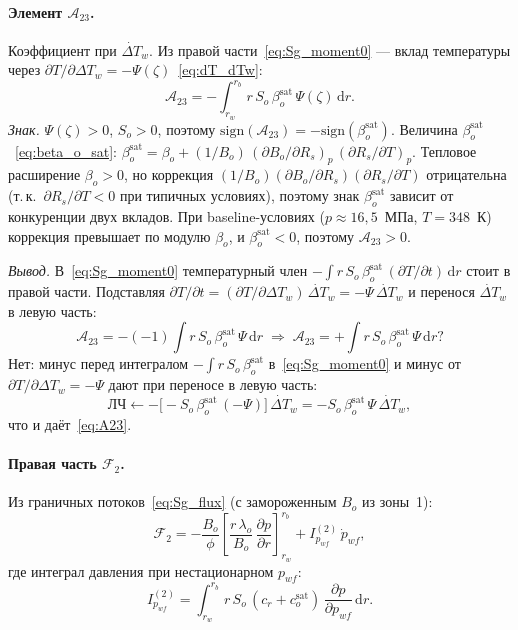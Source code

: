 \documentclass[12pt,a4paper]{article}
\newcommand{\dd}{\mathrm{d}}
\newcommand{\pp}{\partial}
\newcommand{\sat}{\mathrm{sat}}
\begin{document}
\paragraph{Элемент $\mathcal{A}_{23}$.}
Коэффициент при $\dot{\Delta T}_w$. Из правой
части~\eqref{eq:Sg_moment0} --- вклад температуры
через $\pp T / \pp \Delta T_w = -\Psi(\zeta)$~\eqref{eq:dT_dTw}:
\begin{equation}\label{eq:A23}
  \boxed{
    \mathcal{A}_{23}
    = -\int_{r_w}^{r_b} r\,S_o\,\beta_o^\sat\,\Psi(\zeta)\,\dd r.
  }
\end{equation}
\emph{Знак.}
$\Psi(\zeta) > 0$, $S_o > 0$, поэтому
$\mathrm{sign}(\mathcal{A}_{23}) = -\mathrm{sign}(\beta_o^\sat)$.
Величина $\beta_o^\sat$~\eqref{eq:beta_o_sat}:
$\beta_o^\sat = \beta_o + (1/B_o)\,
(\pp B_o/\pp R_s)_p\,(\pp R_s/\pp T)_p$.
Тепловое расширение $\beta_o > 0$, но коррекция
$(1/B_o)(\pp B_o / \pp R_s)(\pp R_s / \pp T)$ отрицательна
(т.\,к.\ $\pp R_s / \pp T < 0$ при типичных условиях),
поэтому знак $\beta_o^\sat$ зависит от конкуренции
двух вкладов. При baseline-условиях
($p \approx 16{,}5$~МПа, $T = 348$~К)
коррекция превышает по модулю $\beta_o$, и
$\beta_o^\sat < 0$,
поэтому $\mathcal{A}_{23} > 0$.

\emph{Вывод.}
В~\eqref{eq:Sg_moment0} температурный член
$-\int r\,S_o\,\beta_o^\sat\,(\pp T/\pp t)\,\dd r$
стоит в правой части. Подставляя
$\pp T / \pp t = (\pp T / \pp\Delta T_w)\,\dot{\Delta T}_w
= -\Psi\,\dot{\Delta T}_w$ и перенося $\dot{\Delta T}_w$
в левую часть:
\[
  \mathcal{A}_{23} = -(-1)\!\int r\,S_o\,\beta_o^\sat\,\Psi\,\dd r
  \;\Longrightarrow\;
  \mathcal{A}_{23} = +\!\int r\,S_o\,\beta_o^\sat\,\Psi\,\dd r?
\]
Нет: минус перед интегралом $-\int r\,S_o\,\beta_o^\sat$
в~\eqref{eq:Sg_moment0} и минус от $\pp T/\pp\Delta T_w = -\Psi$
дают при переносе в левую часть:
\[
  \text{ЛЧ} \leftarrow -\bigl[-S_o\,\beta_o^\sat\,(-\Psi)\bigr]\,\dot{\Delta T}_w
  = -S_o\,\beta_o^\sat\,\Psi\,\dot{\Delta T}_w,
\]
что и даёт~\eqref{eq:A23}.

\paragraph{Правая часть $\mathcal{F}_2$.}
Из граничных потоков~\eqref{eq:Sg_flux}
(с замороженным $B_o$ из зоны~1):
\begin{equation}\label{eq:F2}
  \boxed{
    \mathcal{F}_2
    = -\frac{B_o}{\phi}\!\left[
        \frac{r\,\lambda_o}{B_o}\,\frac{\pp p}{\pp r}
      \right]_{r_w}^{r_b}
    + I_{p_{wf}}^{(2)}\,\dot{p}_{wf},
  }
\end{equation}
где интеграл давления при нестационарном $p_{wf}$:
\begin{equation}\label{eq:I_pwf_2}
  I_{p_{wf}}^{(2)} = \int_{r_w}^{r_b} r\,S_o\,(c_r+c_o^\sat)\,
    \frac{\pp p}{\pp p_{wf}}\,\dd r.
\end{equation}
\end{document}
